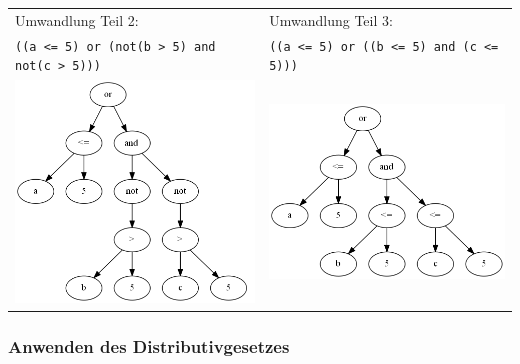 \begin{tabular}{ll}
Umwandlung Teil 2: & Umwandlung Teil 3:\\
\verb|((a <= 5) or (not(b > 5) and not(c > 5)))| & \verb|((a <= 5) or ((b <= 5) and (c <= 5)))|\\
\includegraphics[scale=0.45]{Bilder/not_graph3.png} & \includegraphics[scale=0.45]{Bilder/not_graph4.png}\\
\end{tabular}


\subsubsection{Anwenden des Distributivgesetzes}

